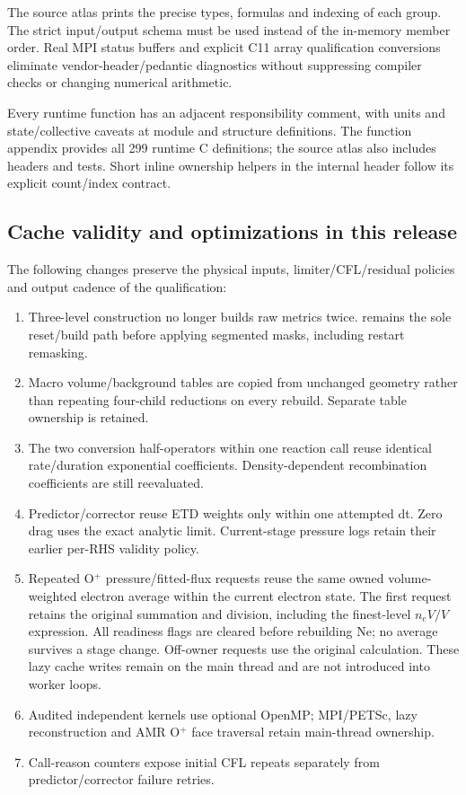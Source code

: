 The source atlas prints the precise types, formulas and indexing of each
group. The strict input/output schema must be used instead of the in-memory
member order. Real MPI status buffers and explicit C11 array qualification
conversions eliminate vendor-header/pedantic diagnostics without suppressing
compiler checks or changing numerical arithmetic.

Every runtime function has an adjacent responsibility comment, with units
and state/collective caveats at module and structure definitions. The
function appendix provides all 299 runtime C definitions; the source atlas
also includes headers and tests. Short inline ownership helpers in the
internal header follow its explicit count/index contract.

\subsection{Cache validity and optimizations in this release}
The following changes preserve the physical inputs, limiter/CFL/residual
policies and output cadence of the qualification:
\begin{enumerate}
\item Three-level construction no longer builds raw metrics twice.
   remains the sole reset/build path before applying
  segmented masks, including restart remasking.
\item Macro volume/background tables are copied from unchanged geometry
  rather than repeating four-child reductions on every rebuild. Separate
  table ownership is retained.
\item The two conversion half-operators within one reaction call reuse
  identical rate/duration exponential coefficients. Density-dependent
  recombination coefficients are still reevaluated.
\item Predictor/corrector reuse ETD weights only within one attempted dt.
  Zero drag uses the exact analytic limit. Current-stage pressure logs
  retain their earlier per-RHS validity policy.
\item Repeated O$^+$ pressure/fitted-flux requests reuse the same owned
  volume-weighted electron average within the current electron state. The
  first request retains the original summation and division, including the
  finest-level $n_eV/V$ expression. All readiness flags are cleared before
  rebuilding Ne; no average survives a stage change. Off-owner requests use
  the original calculation. These lazy cache writes remain on the main
  thread and are not introduced into worker loops.
\item Audited independent kernels use optional OpenMP; MPI/PETSc, lazy
  reconstruction and AMR O$^+$ face traversal retain main-thread ownership.
\item Call-reason counters expose initial CFL repeats separately from
  predictor/corrector failure retries.
\end{enumerate}
